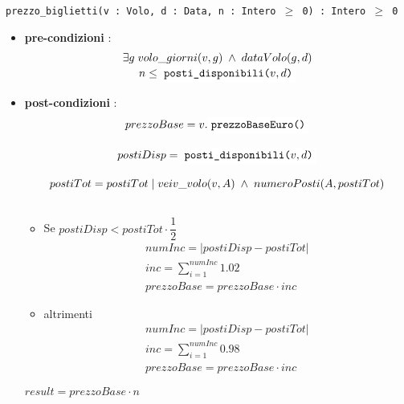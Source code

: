 \documentclass[12pt, letterpaper]{article}
\newcommand{\code}[1]{\colorbox{light-gray}{\texttt{#1}}}
\newcommand{\codee}[1]{\colorbox{white}{\texttt{#1}}}
\begin{document}
\code{prezzo\_biglietti(v : Volo, d : Data, n : Intero $\ge$ 0) : Intero $\ge$ 0}\begin{itemize}
    \item \textbf{pre-condizioni} : $$\begin{matrix}
        \exists g\; volo\_giorni(v,g) \;\land\; dataVolo(g,d)\\ 
        n \le \codee{posti\_disponibili($v,d$)}
    \end{matrix}$$
    \item \textbf{post-condizioni} :$$\begin{matrix}
        prezzoBase = v.\codee{prezzoBaseEuro()}\\  \\
        postiDisp = \codee{posti\_disponibili($v,d$)} \\ \\
        postiTot = postiTot\;|\; veiv\_volo(v,A)\;\land\;numeroPosti(A,postiTot) \\ \\
    \end{matrix} $$
    \begin{itemize}
        \item Se $postiDisp < postiTot\cdot \dfrac{1}{2}$ $$\begin{matrix}
            numInc = |postiDisp-postiTot|\\ 
            inc = \sum_{i=1}^{numInc} 1.02\\
            prezzoBase = prezzoBase\cdot inc
        \end{matrix} $$
        \item altrimenti$$\begin{matrix}
            numInc = |postiDisp-postiTot|\\ 
            inc = \sum_{i=1}^{numInc} 0.98\\
            prezzoBase = prezzoBase\cdot inc
        \end{matrix} $$   
    \end{itemize}
    $result = prezzoBase \cdot n$
\end{itemize}
\end{document}
